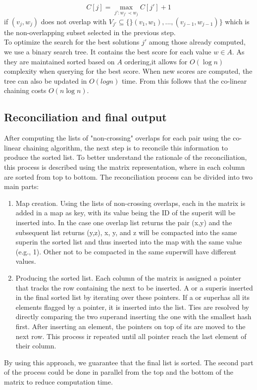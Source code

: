 \begin{equation} 
C[j] = \max_{j':w_{j'} \prec w_j} C[j'] + 1
\end{equation}
if $(v_j,w_j)$ does not overlap with $ V_{j'} \subseteq \{\}(v_1,w_1),...,(v_{j-1},w_{j-1})\}$ which is the non-overlapping subset selected in the previous step.\\
To optimize the search for the best solutions $j'$ among those already computed, we use a binary search tree. It contains the best score for each value $w \in A$. As they are maintained sorted based on $A$ ordering,it allows for $O(\log{n})$ complexity when querying for the best score. When new scores are computed, the tree can also be updated in $O(log{n})$ time. From this follows that the co-linear chaining costs $O(n\log{n})$.

\subsection{Reconciliation and final output}
After computing the lists of "non-crossing" overlaps for each pair using the co-linear chaining algorithm, the next step is to reconcile this information to produce the sorted list. To better understand the rationale of the reconciliation, this process is described using the matrix representation, where \kmers in each column are sorted from top to bottom. The reconciliation process can be divided into two main parts:
\begin{enumerate}
	\item Map creation. Using the lists of non-crossing overlaps, each \kmer in the matrix is added in a map as key, with its value being the ID of the super\kmer it will be inserted into. In the case one overlap list returns the pair (x,y) and the subsequent list returns (y,z), \kmers x, y, and z will be compacted into the same super\kmer in the sorted list and thus inserted into the map with the same value (e.g., 1). Other \kmers not to be compacted in the same super\kmer will have different values.
	\item Producing the sorted list. Each column of the matrix is assigned a pointer that tracks the row containing the next \kmer to be inserted. A \kmer or a super\kmer is inserted in the final sorted list by iterating over these pointers. If a \kmer or super\kmer has all its elements flagged by a pointer, it is inserted into the list. Ties are resolved by directly comparing the two super\kmers and inserting the one with the smallest hash first. After inserting an element, the pointers on top of its \kmers are moved to the next row. This process ir repeated until all pointer reach the last element of their column.
\end{enumerate}
By using this approach, we guarantee that the final list is sorted. The second part of the process could be done in parallel from the top and the bottom of the matrix to reduce computation time.

